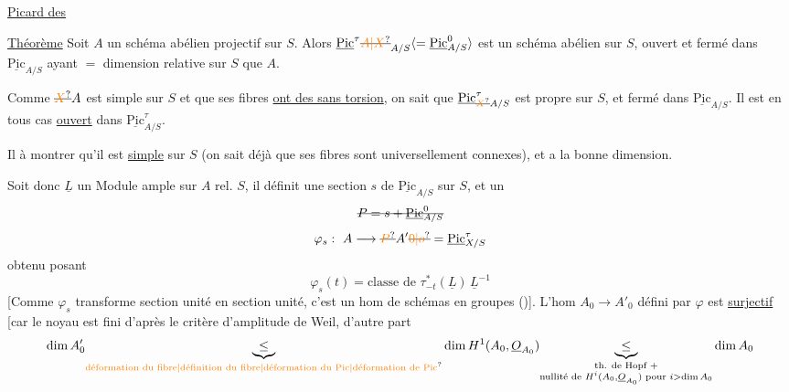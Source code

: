 \uline{Picard des  }

\uline{Théorème} Soit $A$ un schéma abélien projectif sur $S$. Alors $\underline{\mathrm{Pic}}^{\tau}\deleted{\unsure{A|X}}_{A/S}\inserted{=\underline{\mathrm{Pic}}^{0}_{A/S}}$ est un schéma abélien sur $S$, ouvert et fermé dans $\underline{\mathrm{Pic}}_{A/S}$ ayant $=$ dimension relative sur $S$ que $A$.

Comme $\deleted{\unsure{X}}A$ est simple sur $S$ et que ses fibres \uline{ont des  sans torsion}, on sait que $\underline{\mathrm{Pic}}^{\tau}_{\deleted{\unsure{X}}A/S}$ est propre sur $S$, et fermé dans $\underline{\mathrm{Pic}}_{A/S}$. Il est en tous cas \uline{ouvert} dans $\underline{\mathrm{Pic}}^{\tau}_{A/S}$.

Il  à montrer qu'il est \uline{simple} sur $S$ (on sait déjà que ses fibres sont universellement connexes), et a la bonne dimension.

Soit donc $\underline L$ un Module ample sur $A$ rel. $S$, il définit une section $s$ de $\underline{\mathrm{Pic}}_{A/S}$ sur $S$, et un 
\[
\deleted{P=s+\underline{\mathrm{Pic}}^{0}_{A/S}}
\]
\[
\varphi_s:\ A\longrightarrow \deleted{\unsure{P}}A'\deleted{\unsure{0|o}}=\underline{\mathrm{Pic}}^\tau_{X/S}
\]
obtenu posant
\[
\varphi_s(t)=\text{classe de }\tau_{-t}^{*}(\underline L)\,\underline L^{-1}
\]
[Comme $\varphi_s$ transforme section unité en section unité, c'est un hom de schémas en groupes ()].  L'hom $A_0\to A'_0$ défini par $\varphi$ est \uline{surjectif} [car le noyau est fini d'après le critère d'amplitude de Weil, d'autre part
\[
\dim A'_0\underset{\text{\unsure{déformation du fibre|définition du fibre|déformation du Pic|déformation de Pic}}}{\underbrace{\leq}} \dim H^1(A_0,\underline O_{A_0})
\underset{\substack{\text{th. de Hopf }+\\ \text{nullité de }H^i(A_0,\underline O_{A_0})\text{ pour }i>\dim A_0}}{\underbrace{\leq}}\dim A_0
\]

